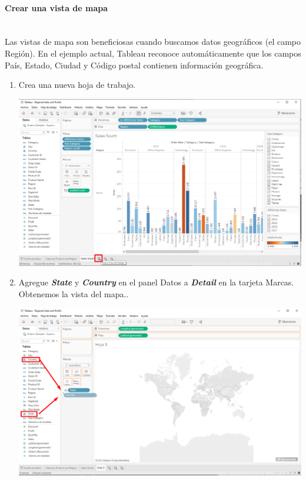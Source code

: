 \documentclass[12pt,letterpaper]{article}
\begin{document}
    \paragraph{\large Crear una vista de mapa\\ \\}
    Las vistas de mapa son beneficiosas cuando buscamos datos geográficos (el campo Región). En el ejemplo actual, Tableau reconoce automáticamente que los campos País, Estado, Ciudad y Código postal contienen información geográfica.
    \begin{enumerate}
        \item Crea una nueva hoja de trabajo.
        \begin{center}
            \includegraphics[width=15cm]{./img/img32.png}
        \end{center}
        \item Agregue \textit{\textbf{State}} y \textit{\textbf{Country}} en el panel Datos a \textit{\textbf{Detail}} en la tarjeta Marcas. Obtenemos la vista del mapa..
        \begin{center}
            \includegraphics[width=15cm]{./img/img33.png}

\end{center}
\end{enumerate}
\end{document}
